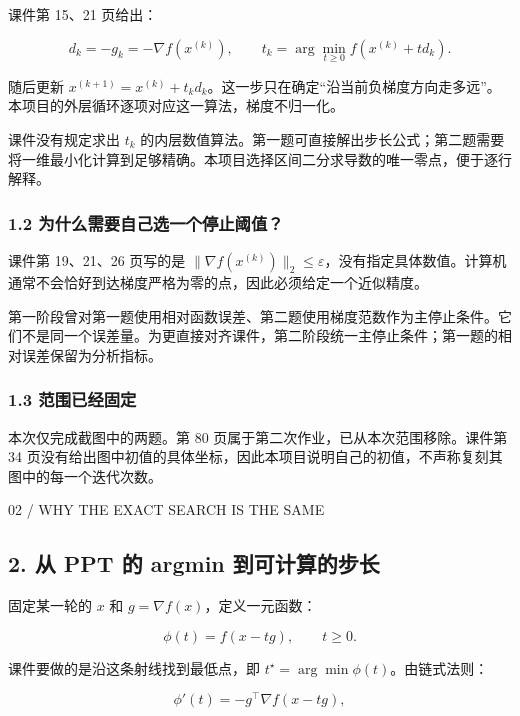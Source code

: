 \documentclass[10pt,a4paper]{article}
\newcommand{\eyebrow}[1]{{\sffamily\fontsize{8.3}{12}\selectfont\color{navy}#1}\par\vspace{4pt}{\color{navy}\hrule height 1pt}\vspace{12pt}}
\begin{document}
课件第 15、21 页给出：

\[d_k=-g_k=-\nabla f(x^{(k)}),\qquad
t_k=\arg\min_{t\ge0}f(x^{(k)}+td_k).\]

随后更新
\(x^{(k+1)}=x^{(k)}+t_kd_k\)。这一步只在确定``沿当前负梯度方向走多远''。本项目的外层循环逐项对应这一算法，梯度不归一化。

课件没有规定求出 \(t_k\)
的内层数值算法。第一题可直接解出步长公式；第二题需要将一维最小化计算到足够精确。本项目选择区间二分求导数的唯一零点，便于逐行解释。

\subsubsection{1.2
为什么需要自己选一个停止阈值？}\label{ux4e3aux4ec0ux4e48ux9700ux8981ux81eaux5df1ux9009ux4e00ux4e2aux505cux6b62ux9608ux503c}

课件第 19、21、26 页写的是
\(\|\nabla f(x^{(k)})\|_2\le\varepsilon\)，没有指定具体数值。计算机通常不会恰好到达梯度严格为零的点，因此必须给定一个近似精度。

第一阶段曾对第一题使用相对函数误差、第二题使用梯度范数作为主停止条件。它们不是同一个误差量。为更直接对齐课件，第二阶段统一主停止条件；第一题的相对误差保留为分析指标。

\subsubsection{1.3
范围已经固定}\label{ux8303ux56f4ux5df2ux7ecfux56faux5b9a}

本次仅完成截图中的两题。第 80 页属于第二次作业，已从本次范围移除。课件第
34
页没有给出图中初值的具体坐标，因此本项目说明自己的初值，不声称复刻其图中的每一个迭代次数。

\clearpage

\eyebrow{02 / WHY THE EXACT SEARCH IS THE SAME}

\subsection{2. 从 PPT 的 argmin
到可计算的步长}\label{ux4ece-ppt-ux7684-argmin-ux5230ux53efux8ba1ux7b97ux7684ux6b65ux957f}

固定某一轮的 \(x\) 和 \(g=\nabla f(x)\)，定义一元函数：

\[\phi(t)=f(x-tg),\qquad t\ge0.\]

课件要做的是沿这条射线找到最低点，即
\(t^\star=\arg\min\phi(t)\)。由链式法则：

\[\phi'(t)=-g^\top\nabla f(x-tg),\]
\end{document}
